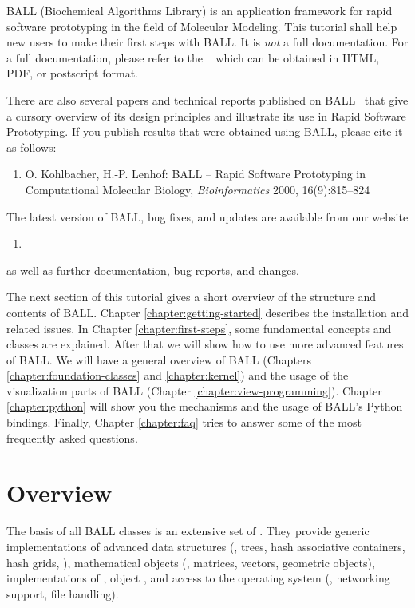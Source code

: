 BALL (Biochemical Algorithms Library) is an application framework for rapid
software prototyping in the field of Molecular Modeling.  This tutorial shall
help new users to make their first steps with BALL. It is {\em not} a full
documentation. For a full documentation, please refer to the ~\cite{BALL-RM} which can be obtained in HTML, PDF, or postscript format.

There are also several papers and technical reports published on
BALL~\cite{BKL2000,BKL99a,BKL99b,KL99,Koh2001} that give a cursory overview 
of its design principles and illustrate its use in Rapid Software Prototyping. If you
publish results that were obtained using BALL, please cite it as follows:
\begin{enumerate}
	\item[] O. Kohlbacher, H.-P. Lenhof: BALL -- Rapid Software Prototyping
  in Computational Molecular Biology, {\em Bioinformatics} 2000,
	16(9):815--824
\end{enumerate}

\noindent
The latest version of BALL, bug fixes, and updates are available from our website

\begin{enumerate}
  \item[] 
\end{enumerate}

\noindent 
as well as further documentation, bug reports, and changes.

The next section of this tutorial gives a short overview of the structure and
contents of BALL. Chapter \ref{chapter:getting-started} describes the
installation and related issues. In Chapter \ref{chapter:first-steps}, some
fundamental concepts and classes are explained. After that we will show how to
use more advanced features of BALL. We will have a general overview of BALL 
 (Chapters \ref{chapter:foundation-classes} and  \ref{chapter:kernel}) 
and the usage of the visualization parts of BALL (Chapter \ref{chapter:view-programming}). 
Chapter \ref{chapter:python} will show you
the mechanisms and the usage of BALL's Python bindings.  Finally, Chapter
\ref{chapter:faq} tries to answer some of the most frequently asked questions.

\section{Overview}


The basis of all BALL classes is an extensive set of .  They provide generic implementations of advanced data structures
(\eg, trees, hash associative containers, hash grids, \etc), mathematical
objects (\eg, matrices, vectors, geometric objects), implementations of
, object , and access to the
operating system (\eg, networking support, file handling).

